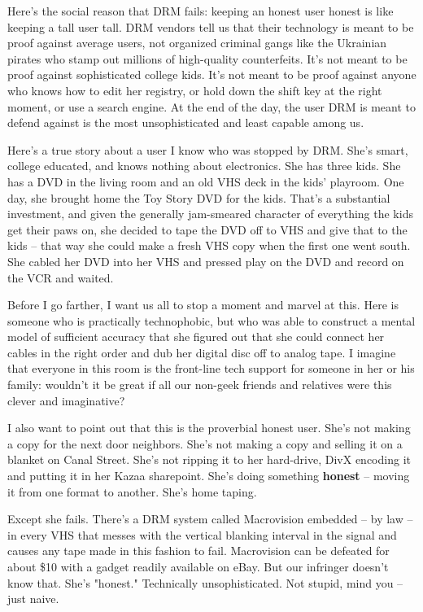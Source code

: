 Here's the social reason that DRM fails: keeping an honest user
honest is like keeping a tall user tall. DRM vendors tell us that
their technology is meant to be proof against average users, not
organized criminal gangs like the Ukrainian pirates who stamp out
millions of high-quality counterfeits. It's not meant to be proof
against sophisticated college kids. It's not meant to be proof
against anyone who knows how to edit her registry, or hold down the
shift key at the right moment, or use a search engine. At the end
of the day, the user DRM is meant to defend against is the most
unsophisticated and least capable among us.

Here's a true story about a user I know who was stopped by DRM.
She's smart, college educated, and knows nothing about electronics.
She has three kids. She has a DVD in the living room and an old VHS
deck in the kids' playroom. One day, she brought home the Toy Story
DVD for the kids. That's a substantial investment, and given the
generally jam-smeared character of everything the kids get their
paws on, she decided to tape the DVD off to VHS and give that to
the kids -- that way she could make a fresh VHS copy when the first
one went south. She cabled her DVD into her VHS and pressed play on
the DVD and record on the VCR and waited.

Before I go farther, I want us all to stop a moment and marvel at
this. Here is someone who is practically technophobic, but who was
able to construct a mental model of sufficient accuracy that she
figured out that she could connect her cables in the right order
and dub her digital disc off to analog tape. I imagine that
everyone in this room is the front-line tech support for someone in
her or his family: wouldn't it be great if all our non-geek friends
and relatives were this clever and imaginative?

I also want to point out that this is the proverbial honest user.
She's not making a copy for the next door neighbors. She's not
making a copy and selling it on a blanket on Canal Street. She's
not ripping it to her hard-drive, DivX encoding it and putting it
in her Kazaa sharepoint. She's doing something \textbf{honest} --
moving it from one format to another. She's home taping.

Except she fails. There's a DRM system called Macrovision embedded
-- by law -- in every VHS that messes with the vertical blanking
interval in the signal and causes any tape made in this fashion to
fail. Macrovision can be defeated for about \$10 with a gadget
readily available on eBay. But our infringer doesn't know that.
She's "honest." Technically unsophisticated. Not stupid, mind you
-- just naive.

